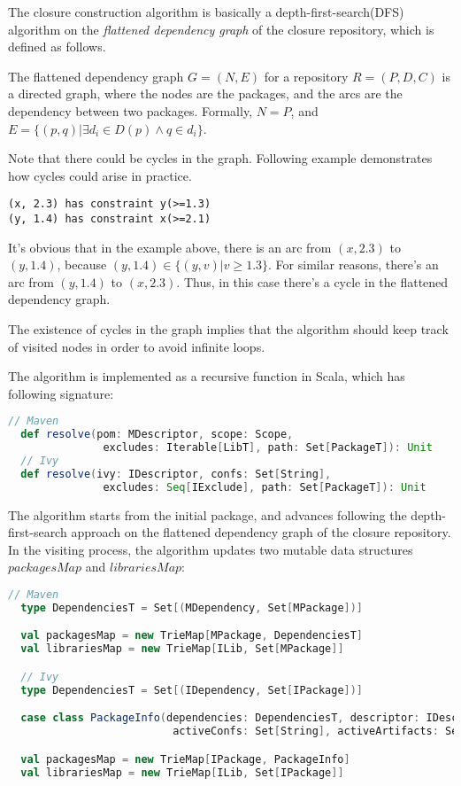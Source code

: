 The closure construction algorithm is basically a depth-first-search(DFS) algorithm on the \emph{flattened dependency graph} of the closure repository, which is defined as follows.

\begin{definition}
  The flattened dependency graph $G = (N, E)$ for a repository $R = (P, D, C)$ is a directed graph, where the nodes are the packages, and the arcs are the dependency between two packages. Formally, $N = P$, and $E = \{ (p, q) | \exists d_i \in D(p) \land q \in d_i\}$.
\end{definition}

Note that there could be cycles in the graph. Following example demonstrates how cycles could arise in practice.

\begin{verbatim}
(x, 2.3) has constraint y(>=1.3)
(y, 1.4) has constraint x(>=2.1)
\end{verbatim}

It's obvious that in the example above, there is an arc from $(x, 2.3)$ to $(y, 1.4)$, because $(y, 1.4) \in \{(y, v) | v \geq 1.3 \}$. For similar reasons, there's an arc from $(y, 1.4)$ to $(x, 2.3)$. Thus, in this case there's a cycle in the flattened dependency graph.

The existence of cycles in the graph implies that the algorithm should keep track of visited nodes in order to avoid infinite loops.

The algorithm is implemented as a recursive function in Scala, which has following signature:
\begin{lstlisting}[language=Scala]
  // Maven
  def resolve(pom: MDescriptor, scope: Scope,
               excludes: Iterable[LibT], path: Set[PackageT]): Unit
  // Ivy
  def resolve(ivy: IDescriptor, confs: Set[String],
               excludes: Seq[IExclude], path: Set[PackageT]): Unit
\end{lstlisting}

The algorithm starts from the initial package, and advances following the depth-first-search approach on the flattened dependency graph of the closure repository. In the visiting process, the algorithm updates two mutable data structures $packagesMap$ and $librariesMap$:

\begin{lstlisting}[language=Scala]
  // Maven
  type DependenciesT = Set[(MDependency, Set[MPackage])]

  val packagesMap = new TrieMap[MPackage, DependenciesT]
  val librariesMap = new TrieMap[ILib, Set[MPackage]]

  // Ivy
  type DependenciesT = Set[(IDependency, Set[IPackage])]

  case class PackageInfo(dependencies: DependenciesT, descriptor: IDescriptor,
                          activeConfs: Set[String], activeArtifacts: Set[String])

  val packagesMap = new TrieMap[IPackage, PackageInfo]
  val librariesMap = new TrieMap[ILib, Set[IPackage]]
\end{lstlisting}

